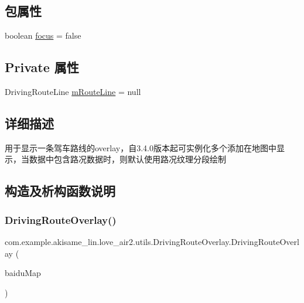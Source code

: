 \subsection*{包属性}
\begin{DoxyCompactItemize}
\item 
boolean \mbox{\hyperlink{classcom_1_1example_1_1akisame__lin_1_1love__air2_1_1utils_1_1_driving_route_overlay_a1c195a8295f6da1f7ab5c5582769ba2d}{focus}} = false
\end{DoxyCompactItemize}
\subsection*{Private 属性}
\begin{DoxyCompactItemize}
\item 
Driving\+Route\+Line \mbox{\hyperlink{classcom_1_1example_1_1akisame__lin_1_1love__air2_1_1utils_1_1_driving_route_overlay_a0e5b39d1d1f6d7cbafcc794f18391bf6}{m\+Route\+Line}} = null
\end{DoxyCompactItemize}


\subsection{详细描述}
用于显示一条驾车路线的overlay，自3.4.\+0版本起可实例化多个添加在地图中显示，当数据中包含路况数据时，则默认使用路况纹理分段绘制 

\subsection{构造及析构函数说明}
\mbox{\label{classcom_1_1example_1_1akisame__lin_1_1love__air2_1_1utils_1_1_driving_route_overlay_a796be25922b0cc1290b2e03c329b8d61}} 
\subsubsection{\texorpdfstring{DrivingRouteOverlay()}{DrivingRouteOverlay()}}
{\footnotesize\ttfamily com.\+example.\+akisame\+\_\+lin.\+love\+\_\+air2.\+utils.\+Driving\+Route\+Overlay.\+Driving\+Route\+Overlay (\begin{DoxyParamCaption}\item[{Baidu\+Map}]{baidu\+Map }\end{DoxyParamCaption})\hspace{0.3cm}{\ttfamily [inline]}}

